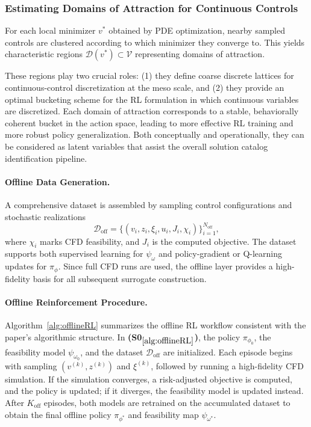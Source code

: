 \documentclass{article}
\newcommand{\1}{\mathds{1}}          %
\theoremstyle{definition}
\begin{document}
\begin{sloppypar}
\subsubsection{Estimating Domains of Attraction for Continuous Controls}
For each local minimizer $v^{*}$ obtained by PDE optimization, nearby sampled controls are clustered according to which minimizer they converge to. This yields characteristic regions $\mathcal{D}(v^{*})\subset\mathcal{V}$ representing domains of attraction.

These regions play two crucial roles: (1) they define coarse discrete lattices for continuous-control discretization at the meso scale,
and (2) they provide an optimal bucketing scheme for the RL formulation in which continuous variables are discretized. Each domain of attraction corresponds to a stable, behaviorally coherent bucket in the action space, leading to more effective RL training and more robust policy generalization. Both conceptually and operationally, they can be considered as latent variables that assist the overall solution catalog identification pipeline.

\paragraph{Offline Data Generation.}
A comprehensive dataset is assembled by sampling control configurations and stochastic realizations
\[
\mathcal{D}_{\mathrm{off}}
=\{(v_i,z_i,\xi_i,u_i,J_i,\chi_i)\}_{i=1}^{N_{\mathrm{off}}},
\]
where $\chi_i$ marks CFD feasibility, and $J_i$ is the computed objective. The dataset supports both supervised learning for $\psi_{\omega}$ and policy-gradient or Q-learning updates for $\pi_{\phi}$. Since full CFD runs are used, the offline layer provides a high-fidelity basis for all subsequent surrogate construction.

\paragraph{Offline Reinforcement Procedure.}
Algorithm~\ref{alg:offlineRL} summarizes the offline RL workflow consistent with the paper’s algorithmic structure. In \textbf{(S0$_{\ref{alg:offlineRL}}$)}, the policy $\pi_{\phi_0}$, the feasibility model $\psi_{\omega_0}$, and the dataset $\mathcal{D}_{\mathrm{off}}$ are initialized. Each episode begins with sampling $(v^{(k)},z^{(k)})$ and $\xi^{(k)}$, followed by running a high-fidelity CFD simulation. If the simulation converges, a risk-adjusted objective is computed, and the policy is updated; if it diverges, the feasibility model is updated instead. After $K_{\mathrm{off}}$ episodes, both models are retrained on the accumulated dataset to obtain the final offline policy $\pi_{\phi^{*}}$ and feasibility map $\psi_{\omega^{*}}$.


\end{sloppypar}
\end{document}
